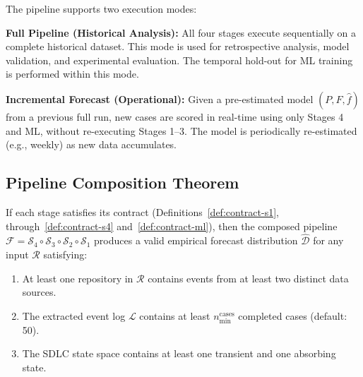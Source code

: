 The pipeline supports two execution modes:

\textbf{Full Pipeline (Historical Analysis):} All four stages execute 
sequentially on a complete historical dataset. This mode is used for 
retrospective analysis, model validation, and experimental evaluation. 
The temporal hold-out for ML training is performed within this mode.

\textbf{Incremental Forecast (Operational):} Given a pre-estimated model 
$(P, \hat{F}, \hat{f})$ from a previous full run, new cases are scored 
in real-time using only Stages 4 and ML, without re-executing Stages 1–3. 
The model is periodically re-estimated (e.g., weekly) as new data 
accumulates.


\subsection{Pipeline Composition Theorem}
\label{sec:composition}

\begin{theorem}
\label{thm:pipeline-correctness}
If each stage satisfies its contract (Definitions~\ref{def:contract-s1}, 
through~\ref{def:contract-s4} and~\ref{def:contract-ml}), then the 
composed pipeline $\mathcal{F} = \mathcal{S}_4 \circ \mathcal{S}_3 \circ 
\mathcal{S}_2 \circ \mathcal{S}_1$ produces a valid empirical forecast 
distribution $\hat{\mathcal{D}}$ for any input $\mathcal{R}$ satisfying:
\begin{enumerate}
    \item At least one repository in $\mathcal{R}$ contains events from 
    at least two distinct data sources.
    \item The extracted event log $\mathcal{L}$ contains at least 
    $n_{\min}^{\text{cases}}$ completed cases (default: 50).
    \item The SDLC state space contains at least one transient and one 
    absorbing state.
\end{enumerate}
\end{theorem}

